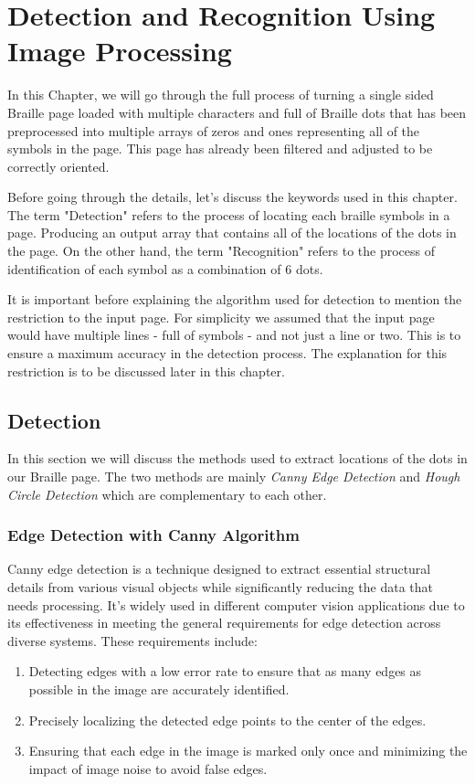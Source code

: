 \section{Detection and Recognition Using Image Processing}
\setcounter{figure}{0}
\renewcommand{\thefigure}{5.\arabic{figure}}

In this Chapter, we will go through the full process of turning a single sided Braille page loaded with multiple characters and full of Braille dots that has been preprocessed into multiple arrays of zeros and ones representing all of the symbols in the page. This page has already been filtered and adjusted to be correctly oriented. 

Before going through the details, let's discuss the keywords used in this chapter. The term "Detection" refers to the process of locating each braille symbols in a page. Producing an output array that contains all of the locations of the dots in the page. On the other hand, the term "Recognition" refers to the process of identification of each symbol as a combination of 6 dots.

It is important before explaining the algorithm used for detection to mention the restriction to the input page. For simplicity we assumed that the input page would have multiple lines - full of symbols - and not just a line or two. This is to ensure a maximum accuracy in the detection process. The explanation for this restriction is to be discussed later in this chapter.
\subsection{Detection}
In this section we will discuss the methods used to extract locations of the dots in our Braille page. The two methods are mainly \textit{Canny Edge Detection} and \textit{Hough Circle Detection} which are complementary to each other.
\subsubsection{Edge Detection with Canny Algorithm}
Canny edge detection is a technique designed to extract essential structural details from various visual objects while significantly reducing the data that needs processing. It's widely used in different computer vision applications due to its effectiveness in meeting the general requirements for edge detection across diverse systems. These requirements include:
\begin{enumerate}
        \item Detecting edges with a low error rate to ensure that as many edges as possible in the image are accurately identified.
        \item Precisely localizing the detected edge points to the center of the edges.
        \item Ensuring that each edge in the image is marked only once and minimizing the impact of image noise to avoid false edges.
\end{enumerate}


